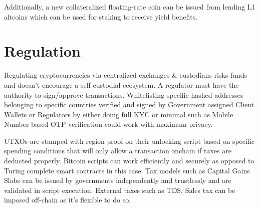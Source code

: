\documentclass[a4paper,10pt]{article}
\begin{document}
Additionally, a new collateralized floating-rate coin can be issued from lending L1 altcoins which can be used for staking to receive yield benefits. 
\section{Regulation}
Regulating cryptocurrencies via centralized exchanges \& custodians risks funds and doesn't encourage a self-custodial ecosystem. A regulator must have the authority to sign/approve transactions. Whitelisting specific hashed addresses belonging to specific countries verified and signed by Government assigned Client Wallets or Regulators by either doing full KYC or minimal such as Mobile Number based OTP verification could work with maximum privacy.

 UTXOs are stamped with region proof on their unlocking script based on specific spending conditions that will only allow a transaction onchain if taxes are deducted properly. Bitcoin scripts can work efficiently and securely as opposed to Turing complete smart contracts in this case. Tax models such as Capital Gains Slabs can be issued by governments independently and trustlessly and are validated in script execution. External taxes such as TDS, Sales tax can be imposed off-chain as it's flexible to do so.
\end{document}

